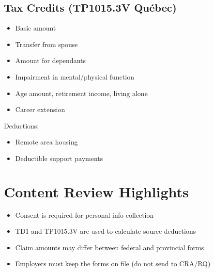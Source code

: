 \documentclass[letterpaper,10pt,english]{sphinxmanual}
\begin{document}
\subsection{Tax Credits (TP\sphinxhyphen{}1015.3\sphinxhyphen{}V \textendash{} Québec)}
\label{\detokenize{onboarding_employee:tax-credits-tp-1015-3-v-quebec}}\begin{itemize}
\item {} 
\sphinxAtStartPar
Basic amount

\item {} 
\sphinxAtStartPar
Transfer from spouse

\item {} 
\sphinxAtStartPar
Amount for dependants

\item {} 
\sphinxAtStartPar
Impairment in mental/physical function

\item {} 
\sphinxAtStartPar
Age amount, retirement income, living alone

\item {} 
\sphinxAtStartPar
Career extension

\end{itemize}

\sphinxAtStartPar
Deductions:
\begin{itemize}
\item {} 
\sphinxAtStartPar
Remote area housing

\item {} 
\sphinxAtStartPar
Deductible support payments

\end{itemize}


\section{Content Review Highlights}
\label{\detokenize{onboarding_employee:content-review-highlights}}\begin{itemize}
\item {} 
\sphinxAtStartPar
Consent is required for personal info collection

\item {} 
\sphinxAtStartPar
TD1 and TP\sphinxhyphen{}1015.3\sphinxhyphen{}V are used to calculate source deductions

\item {} 
\sphinxAtStartPar
Claim amounts may differ between federal and provincial forms

\item {} 
\sphinxAtStartPar
Employers must keep the forms on file (do not send to CRA/RQ)

\end{itemize}
\end{document}

